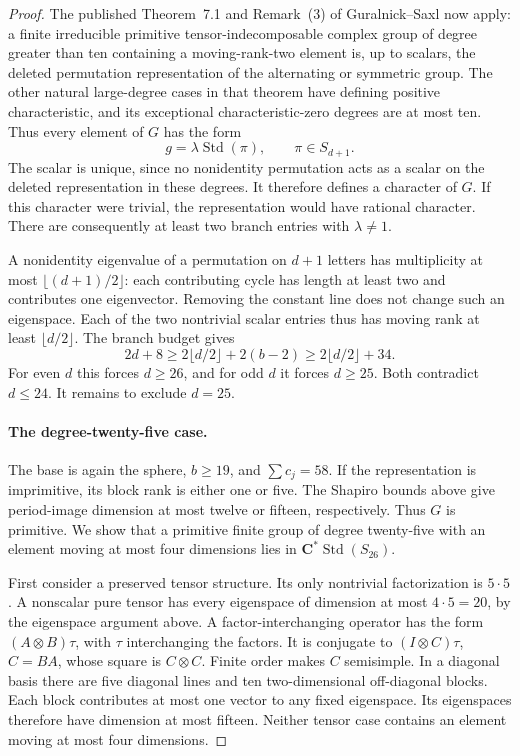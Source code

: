 \documentclass[11pt]{article}
\theoremstyle{definition}
\theoremstyle{remark}
\newcommand{\C}{\mathbf C}
\begin{document}
\begin{proof}
The published Theorem~7.1 and Remark~(3) of Guralnick--Saxl \cite[pp.~548--549]{GS} now apply: a finite irreducible primitive tensor-indecomposable complex group of degree greater than ten containing a moving-rank-two element is, up to scalars, the deleted permutation representation of the alternating or symmetric group. The other natural large-degree cases in that theorem have defining positive characteristic, and its exceptional characteristic-zero degrees are at most ten. Thus every element of $G$ has the form
\[
 g=\lambda\operatorname{Std}(\pi),\qquad\pi\in S_{d+1}.
\]
The scalar is unique, since no nonidentity permutation acts as a scalar on the deleted representation in these degrees. It therefore defines a character of $G$. If this character were trivial, the representation would have rational character. There are consequently at least two branch entries with $\lambda\ne1$.

A nonidentity eigenvalue of a permutation on $d+1$ letters has multiplicity at most $\lfloor(d+1)/2\rfloor$: each contributing cycle has length at least two and contributes one eigenvector. Removing the constant line does not change such an eigenspace. Each of the two nontrivial scalar entries thus has moving rank at least $\lfloor d/2\rfloor$. The branch budget gives
\[
 2d+8\ge2\lfloor d/2\rfloor+2(b-2)
       \ge2\lfloor d/2\rfloor+34.
\]
For even $d$ this forces $d\ge26$, and for odd $d$ it forces $d\ge25$. Both contradict $d\le24$. It remains to exclude $d=25$.

\paragraph{The degree-twenty-five case.}
The base is again the sphere, $b\ge19$, and $\sum c_j=58$. If the
representation is imprimitive, its block rank is either one or five.
The Shapiro bounds above give period-image dimension at most twelve
or fifteen, respectively. Thus $G$ is primitive. We show that a
primitive finite group of degree twenty-five with an element moving
at most four dimensions lies in
$\C^*\operatorname{Std}(S_{26})$.

First consider a preserved tensor structure. Its only nontrivial
factorization is $5\cdot5$. A nonscalar pure tensor has every
 eigenspace of dimension at most $4\cdot5=20$, by the eigenspace
argument above. A factor-interchanging operator has the form
$(A\otimes B)\tau$, with $\tau$ interchanging the factors. It is
conjugate to $(I\otimes C)\tau$, $C=BA$, whose square is
$C\otimes C$. Finite order makes $C$ semisimple. In a diagonal basis
there are five diagonal lines and ten two-dimensional off-diagonal
blocks. Each block contributes at most one vector to any fixed
 eigenspace. Its eigenspaces therefore have dimension at most fifteen.
Neither tensor case contains an element moving at most four dimensions.


\end{proof}
\end{document}
